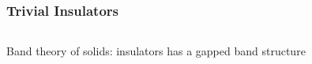 \begin{frame}
    \frametitle{Trivial Insulators}
    \begin{columns}

            Band theory of solids: insulators has a gapped band structure



\end{columns}
\end{frame}
